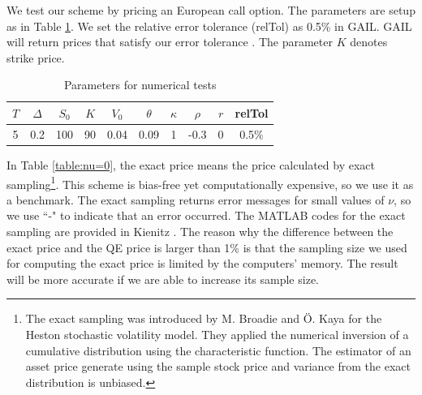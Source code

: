 \documentclass{ws-ijfe}
\begin{document}
We test our scheme by pricing an European call option. The parameters are setup as in Table \ref{tab:params setup for n=0}. We set the relative error tolerance (relTol) as 0.5\% in GAIL. GAIL will return prices that satisfy our error tolerance \cite{Hickernell2012}. The parameter $K$ denotes strike price.
\begin{table}[h]
 \caption{Parameters for numerical tests} %
 \centering                          %
 \begin{tabular}{cccccccccc}          %
 \hline\hline                        %
 $T$ & $\Delta$ & $S_0$ & $K$ & $V_0$ & $\theta$ & $\kappa$ & $\rho$ & $r$ & relTol\\ [0.5ex]
 \hline                                      %
5  & 0.2 & 100 & 90 & 0.04 & 0.09 & 1 & -0.3& 0 & 0.5\%\\[1ex] %
 \hline                                       %
 \end{tabular}
 \label{tab:params setup for n=0}
 \end{table}
In Table \ref{table:nu=0}, the exact price means the price calculated by exact sampling\footnote{The exact sampling was introduced by M. Broadie and \"{O}. Kaya for the Heston stochastic volatility model. They applied the numerical inversion of a cumulative distribution using the characteristic function. The estimator of an asset price generate using the sample stock price and variance from the exact distribution is unbiased.}. This scheme is bias-free yet computationally expensive, so we use it as a benchmark. The exact sampling returns error messages for small values of $\nu$, so we use ``-" to indicate that an error occurred. The MATLAB codes for the exact sampling are provided in Kienitz \cite{Kienitz2012}. The reason why the difference between the exact price and the QE price is larger than 1\%  is that the sampling size we used for computing the exact price is limited by the computers' memory. The result will be more accurate if we are able to increase its sample size.
\begin{table}[h]
\caption{Test of European call options with $\nu$ close or equal to zero}
\label{table:nu=0}
\centering
{}
\end{table}
\end{document}
